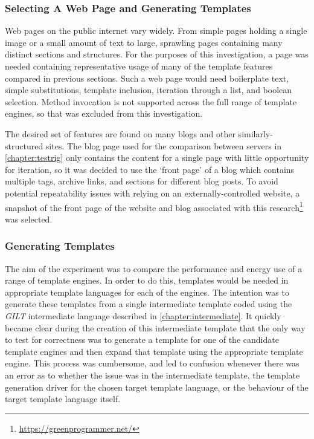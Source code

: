 \subsubsection{Selecting A Web Page and Generating Templates}
\label{cce pages}

Web pages on the public internet vary widely. From simple pages holding a single image or a small amount of text to large, sprawling pages containing many distinct sections and structures. For the purposes of this investigation, a page was needed containing representative usage of many of the template features compared in previous sections. Such a web page would need boilerplate text, simple substitutions, template inclusion, iteration through a list, and boolean selection. Method invocation is not supported across the full range of template engines, so that was excluded from this investigation.

The desired set of features are found on many blogs and other similarly-structured sites. The blog page used for the comparison between servers in \autoref{chapter:testrig} only contains the content for a single page with little opportunity for iteration, so it was decided to use the `front page' of a blog which contains multiple tags, archive links, and sections for different blog posts. To avoid potential repeatability issues with relying on an externally-controlled website, a snapshot of the front page of the website and blog associated with this research\footnote{\url{https://greenprogrammer.net/}} was selected.

\subsubsection{Generating Templates}
\label{cce gilt}

The aim of the experiment was to compare the performance and energy use of a range of template engines. In order to do this, templates would be needed in appropriate template languages for each of the engines. The intention was to generate these templates from a single intermediate template coded using the \emph{GILT} intermediate language described in \autoref{chapter:intermediate}. It quickly became clear during the creation of this intermediate template that the only way to test for correctness was to generate a template for one of the candidate template engines and then expand that template using the appropriate template engine. This process was cumbersome, and led to confusion whenever there was an error as to whether the issue was in the intermediate template, the template generation driver for the chosen target template language, or the behaviour of the target template language itself.

